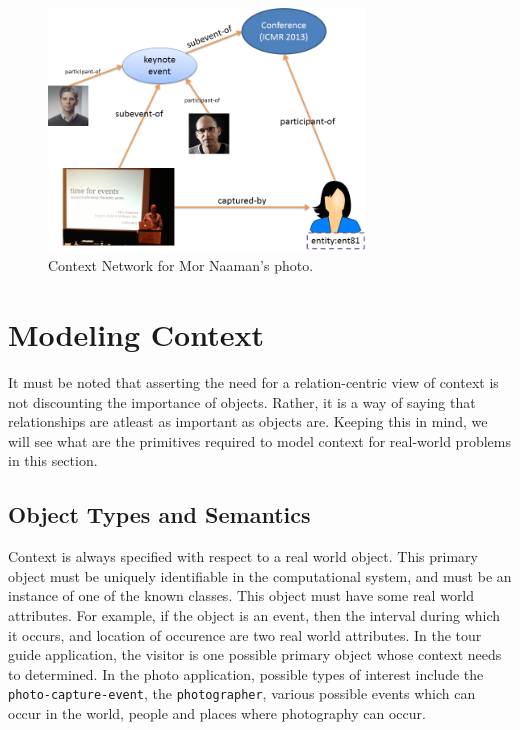 \begin{figure}[h]
\centering
\includegraphics[width=0.75\textwidth]{media/chapter2/naaman-4.png}
\caption{Context Network for Mor Naaman's photo.}
\label{fig:context-network}
\end{figure}

\section{Modeling Context}

It must be noted that asserting the need for a relation-centric view of context is not discounting the importance of objects. Rather, it is a way of saying that relationships are atleast as important as objects are. Keeping this in mind, we will see what are the primitives required to model context for real-world problems in this section.

\subsection{Object Types and Semantics}

Context is always specified with respect to a real world object. This primary object must be uniquely identifiable in the computational system, and must be an instance of one of the known classes. This object must have some real world attributes. For example, if the object is an event, then the interval during which it occurs, and location of occurence are two real world attributes. In the tour guide application, the visitor is one possible primary object whose context needs to determined. In the photo application, possible types of interest include the \texttt{photo-capture-event}, the \texttt{photographer}, various possible events which can occur in the world, people and places where photography can occur.

